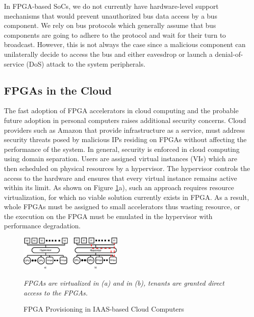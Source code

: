 \documentclass[sigconf]{acmart}
\theoremstyle{plain}
\theoremstyle{remark}
\begin{document}
In FPGA-based SoCs, we do not currently have hardware-level support mechanisms that would prevent unauthorized bus data access by a bus component. We rely on bus protocols which generally assume that bus components are going to adhere to the protocol and wait for their turn to broadcast. However, this is not always the case since a malicious component can unilaterally decide to access the bus and either eavesdrop or launch a denial-of-service (DoS) attack to the system peripherals.

\subsection{FPGAs in the Cloud}
The fast adoption of FPGA accelerators in cloud computing and the probable future adoption in personal computers raises additional security concerns. Cloud providers such as Amazon that provide infrastructure as a service, must address security threats posed by malicious IPs residing on FPGAs without affecting the performance of the system. In general, security is enforced in cloud computing using domain separation. Users are assigned virtual instances (VIs) which are then scheduled on physical resources by a hypervisor. The hypervisor controls the access to the hardware and ensures that every virtual instance remains active within its limit. As shown on Figure \ref{fig:iaas-fpga}a), such an approach requires resource virtualization, for which no viable solution currently exists in FPGA. As a result, whole FPGAs must be assigned to small accelerators thus wasting resource, or the execution on the FPGA must be emulated in the hypervisor with performance degradation.

\begin{figure}[h]
\centering
\includegraphics[width=0.45\textwidth]{figures/CloudThreatModel.pdf}
\caption{FPGA Provisioning in IAAS-based Cloud Computers}
\textit{FPGAs are virtualized in (a) and in (b), tenants are granted direct access to the FPGAs.}
\label{fig:iaas-fpga}
\end{figure}
\end{document}
